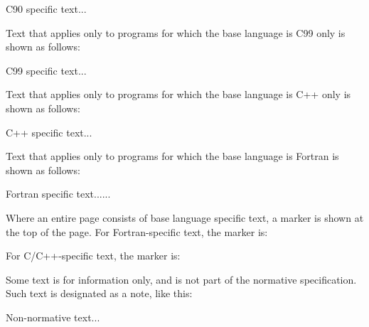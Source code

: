 \begin{c90specific}
C90 specific text...
\end{c90specific}

Text that applies only to programs for which the base language is C99 only is shown as 
follows:

\begin{c99specific}
C99 specific text...
\end{c99specific}

Text that applies only to programs for which the base language is C++ only is shown as 
follows:

\begin{cppspecific}
C++ specific text...
\end{cppspecific}

Text that applies only to programs for which the base language is Fortran is shown as follows: 

\begin{fortranspecific}
Fortran specific text......
\end{fortranspecific}

Where an entire page consists of base language specific text, a marker is shown
at the top of the page.  For Fortran-specific text, the marker is:

\bigskip
{}
\bigskip

For C/C++-specific text, the marker is:

\bigskip
{}
\bigskip

Some text is for information only, and is not part of the normative specification. Such 
text is designated as a note, like this: 

\begin{note}
Non-normative text...
\end{note}




